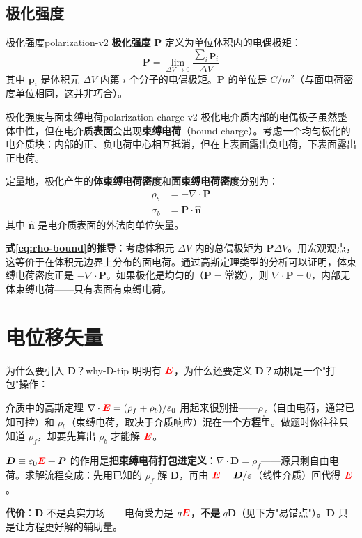 \documentclass[11pt,a4paper,openany,oneside]{book}
\newcommand{\vecE}{\textcolor{red}{\vect{E}}}
\newcommand{\eps}{\varepsilon}
\newcommand{\vect}[1]{\bm{#1}}
\newcommand{\unitvec}[1]{\hat{\vect{#1}}}
\newcommand{\divg}{\nabla\cdot}
\begin{document}
\subsection{极化强度}

\begin{definition}{极化强度}{polarization-v2}
\textbf{极化强度} $\vect{P}$ 定义为单位体积内的电偶极矩：
\[
\vect{P} = \lim_{\Delta V \to 0} \frac{\sum_i \vect{p}_i}{\Delta V}
\]
其中 $\vect{p}_i$ 是体积元 $\Delta V$ 内第 $i$ 个分子的电偶极矩。$\vect{P}$ 的单位是 $\si{C/m^2}$（与面电荷密度单位相同，这并非巧合）。
\end{definition}

\begin{insight}{极化强度与面束缚电荷}{polarization-charge-v2}
极化电介质内部的电偶极子虽然整体中性，但在电介质\textbf{表面}会出现\textbf{束缚电荷}（bound charge）。考虑一个均匀极化的电介质块：内部的正、负电荷中心相互抵消，但在上表面露出负电荷，下表面露出正电荷。

定量地，极化产生的\textbf{体束缚电荷密度}和\textbf{面束缚电荷密度}分别为：
\begin{align}
\rho_b &= -\divg\vect{P} \label{eq:rho-bound} \\
\sigma_b &= \vect{P} \cdot \unitvec{n} \label{eq:sigma-bound}
\end{align}
其中 $\unitvec{n}$ 是电介质表面的外法向单位矢量。
\end{insight}

\textbf{式\eqref{eq:rho-bound}的推导}：考虑体积元 $\Delta V$ 内的总偶极矩为 $\vect{P}\Delta V$。用宏观观点，这等价于在体积元边界上分布的面电荷。通过高斯定理类型的分析可以证明，体束缚电荷密度正是 $-\divg\vect{P}$。如果极化是均匀的（$\vect{P} = \text{常数}$），则 $\divg\vect{P} = 0$，内部无体束缚电荷——只有表面有束缚电荷。

\section{电位移矢量}

\begin{tip}{为什么要引入 $\vect{D}$？}{why-D-tip}
明明有 $\vecE$，为什么还要定义 $\vect{D}$？动机是一个"打包"操作：

介质中的高斯定理 $\divg\vecE = (\rho_f + \rho_b)/\eps_0$ 用起来很别扭——$\rho_f$（自由电荷，通常已知可控）和 $\rho_b$（束缚电荷，取决于介质响应）混在\textbf{一个方程}里。做题时你往往只知道 $\rho_f$，却要先算出 $\rho_b$ 才能解 $\vecE$。

$\vect{D} \equiv \eps_0\vecE + \vect{P}$ 的作用是\textbf{把束缚电荷打包进定义}：$\divg\vect{D} = \rho_f$——源只剩自由电荷。求解流程变成：先用已知的 $\rho_f$ 解 $\vect{D}$，再由 $\vecE = \vect{D}/\eps$（线性介质）回代得 $\vecE$。

\textbf{代价}：$\vect{D}$ 不是真实力场——电荷受力是 $q\vecE$，\textbf{不是} $q\vect{D}$（见下方"易错点"）。$\vect{D}$ 只是让方程更好解的辅助量。
\end{tip}
\end{document}
